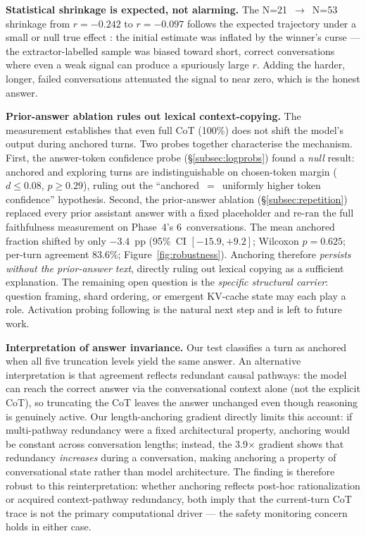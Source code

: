 \documentclass{article}
\begin{document}
\textbf{Statistical shrinkage is expected, not alarming.}
The N=21~$\to$~N=53 shrinkage from $r=-0.242$ to $r=-0.097$ follows
the expected trajectory under a small or null true effect
\citep{gelman2014}: the initial estimate was inflated by the
winner's curse \citep{ioannidis2008} --- the extractor-labelled sample
was biased toward short, correct conversations where even a weak signal
can produce a spuriously large $r$.
Adding the harder, longer, failed conversations attenuated the signal
to near zero, which is the honest answer.

\textbf{Prior-answer ablation rules out lexical context-copying.}
The measurement establishes that even full CoT (100\%) does not shift
the model's output during anchored turns.
Two probes together characterise the mechanism.
First, the answer-token confidence probe (\S\ref{subsec:logprobs})
found a \emph{null} result: anchored and exploring turns are
indistinguishable on chosen-token margin ($d \leq 0.08$, $p \geq
0.29$), ruling out the ``anchored~$=$~uniformly higher token
confidence'' hypothesis.
Second, the prior-answer ablation (\S\ref{subsec:repetition})
replaced every prior assistant answer with a fixed placeholder and
re-ran the full faithfulness measurement on Phase~4's 6~conversations.
The mean anchored fraction shifted by only $-3.4$~pp
(95\%~CI $[-15.9, +9.2]$; Wilcoxon $p=0.625$; per-turn agreement
83.6\%; Figure~\ref{fig:robustness}).
Anchoring therefore \emph{persists without the prior-answer text},
directly ruling out lexical copying as a sufficient explanation.
The remaining open question is the \emph{specific structural carrier}:
question framing, shard ordering, or emergent KV-cache state may
each play a role.
Activation probing following \citet{reasoning_theater2026} is the
natural next step and is left to future work.


\textbf{Interpretation of answer invariance.}
Our test classifies a turn as anchored when all five truncation
levels yield the same answer.
An alternative interpretation is that agreement reflects redundant
causal pathways: the model can reach the correct answer via the
conversational context alone (not the explicit CoT),
so truncating the CoT leaves the answer unchanged even though
reasoning is genuinely active.
Our length-anchoring gradient directly limits this account:
if multi-pathway redundancy were a fixed architectural property,
anchoring would be constant across conversation lengths;
instead, the 3.9$\times$ gradient shows that redundancy \emph{increases}
during a conversation, making anchoring a property of conversational
state rather than model architecture.
The finding is therefore robust to this reinterpretation:
whether anchoring reflects post-hoc rationalization or acquired
context-pathway redundancy, both imply that the current-turn CoT
trace is not the primary computational driver --- the safety
monitoring concern holds in either case.
\end{document}
